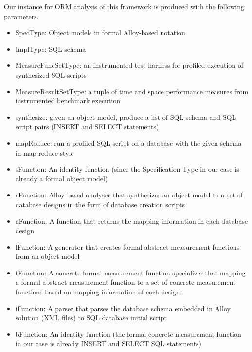 \documentclass{sig-alternate}
\begin{document}
Our instance for ORM analysis of this framework is produced with the following parameters.
\begin{itemize}
\setlength{\itemsep}{0pt}
\setlength{\parskip}{0pt}
\item \textsf{SpecType}: Object models in formal Alloy-based notation
\item \textsf{ImplType}: SQL schema
\item \textsf{MeasureFuncSetType}: an instrumented test harness for profiled execution of synthesized SQL scripts
\item \textsf{MeasureResultSetType}: a tuple of time and space performance measures from instrumented benchmark execution
\item \textsf{synthesize}: given an object model, produce a list of SQL schema and SQL script pairs (INSERT and SELECT statements) 
\item \textsf{mapReduce}: run a profiled SQL script on a database with the given schema in map-reduce style %
\item \textsf{sFunction}: An identity function (since the Specification Type in our case is already a formal object model)
\item \textsf{cFunction}: Alloy based analyzer that synthesizes an object model to a set of database designs in the form of database creation scripts
\item \textsf{aFunction}: A function that returns the mapping information in each database design
\item \textsf{lFunction}: A generator that creates formal abstract measurement functions from an object model
\item \textsf{tFunction}: A concrete formal measurement function specializer that mapping a formal abstract measurement function to a set of concrete measurement functions based on mapping information of each designs
\item \textsf{iFunction}: A parser that parses the database schema embedded in Alloy solution (XML files) to SQL database initial script
\item \textsf{bFunction}: An identity function (the formal concrete measurement function in our case is already INSERT and SELECT SQL statements)
\end{itemize}

 
\end{document}
